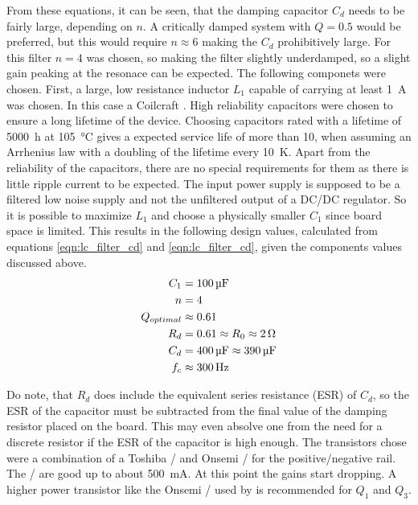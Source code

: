 From these equations, it can be seen, that the damping capacitor $C_d$ needs to be fairly large, depending on $n$. A critically damped system with $Q = \num{0.5}$ would be preferred, but this would require $n \approx 6$ making the $C_d$ prohibitively large. For this filter $n=4$ was chosen, so making the filter slightly underdamped, so a slight gain peaking at the resonace can be expected. The following componets were chosen. First, a large, low resistance inductor $L_1$ capable of carrying at least \qty{1}{\A} was chosen. In this case a Coilcraft . High reliability capacitors were chosen to ensure a long lifetime of the device. Choosing capacitors rated with a lifetime of \qty{5000}{\hour} at \qty{105}{\celsius} gives a expected service life of more than \qty{10}{\year}, when assuming an Arrhenius law with a doubling of the lifetime every \qty{10}{\kelvin}. Apart from the reliability of the capacitors, there are no special requirements for them as there is little ripple current to be expected. The input power supply is supposed to be a filtered low noise supply and not the unfiltered output of a DC/DC regulator. So it is possible to maximize $L_1$ and choose a physically smaller $C_1$ since board space is limited. This results in the following design values, calculated from equations \ref{eqn:lc_filter_cd} and \ref{eqn:lc_filter_cd}, given the components values discussed above.
\begin{align}
    C_1 &= \qty{100}{\uF} \nonumber\\
    n &= 4 \nonumber\\
    Q_{optimal} &\approx \num{0.61} \nonumber\\
    R_d &= \num{0.61} \approx R_0 \approx \qty{2}{\ohm} \nonumber\\
    C_d &= \qty{400}{\uF} \approx \qty{390}{\uF} \nonumber\\
    f_c &\approx \qty{300}{\Hz} \nonumber
\end{align}

Do note, that $R_d$ does include the equivalent series resistance (ESR) of $C_d$, so the ESR of the capacitor must be subtracted from the final value of the damping resistor placed on the board. This may even absolve one from the need for a discrete resistor if the ESR of the capacitor is high enough. The transistors chose were a combination of a Toshiba / and Onsemi / for the positive/negative rail. The / are good up to about \qty{500}{\mA}. At this point the gains start dropping. A higher power transistor like the Onsemi / used by \citeauthor{laser_driver_qcl_taubman} is recommended for $Q_1$ and $Q_3$.

